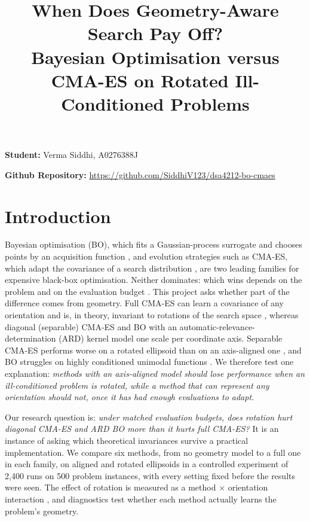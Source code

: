 \documentclass[12pt]{article}
\begin{document}
\title{When Does Geometry-Aware Search Pay Off?\\
\large Bayesian Optimisation versus CMA-ES on Rotated Ill-Conditioned Problems}
\date{}
\maketitle
{\bf Student:} Verma Siddhi, A0276388J

{\bf Github Repository:} \url{https://github.com/SiddhiV123/dsa4212-bo-cmaes}


\section{Introduction}
\label{sec:intro}
Bayesian optimisation (BO), which fits a Gaussian-process surrogate and chooses points by an acquisition function \parencite{frazier2018tutorial}, and evolution strategies such as CMA-ES, which adapt the covariance of a search distribution \parencite{hansen2023tutorial}, are two leading families for expensive black-box optimisation. Neither dominates: which wins depends on the problem and on the evaluation budget \parencite{raponi2023low,leriche2021revisiting}. This project asks whether part of the difference comes from geometry. Full CMA-ES can learn a covariance of any orientation and is, in theory, invariant to rotations of the search space \parencite{hansen2023tutorial}, whereas diagonal (separable) CMA-ES \parencite{ros2008simple} and BO with an automatic-relevance-determination (ARD) kernel \parencite[p.~106]{rasmussen2006gpml} model one scale per coordinate axis. Separable CMA-ES performs worse on a rotated ellipsoid than on an axis-aligned one \parencite{loshchilov2014lmcma}, and BO struggles on highly conditioned unimodal functions \parencite{leriche2021revisiting}. We therefore test one explanation: \emph{methods with an axis-aligned model should lose performance when an ill-conditioned problem is rotated, while a method that can represent any orientation should not, once it has had enough evaluations to adapt.}

Our research question is: \emph{under matched evaluation budgets, does rotation hurt diagonal CMA-ES and ARD BO more than it hurts full CMA-ES?} It is an instance of asking which theoretical invariances survive a practical implementation. We compare six methods, from no geometry model to a full one in each family, on aligned and rotated ellipsoids in a controlled experiment of 2{,}400 runs on 500 problem instances, with every setting fixed before the results were seen. The effect of rotation is measured as a method $\times$ orientation interaction \parencite[p.~232]{montgomery2017design}, and diagnostics test whether each method actually learns the problem's geometry.
\end{document}
